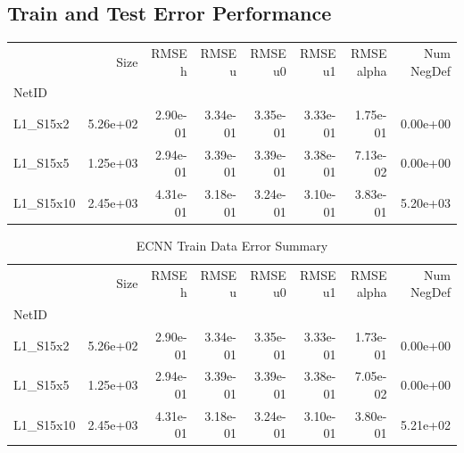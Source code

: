 \documentclass{article}
\theoremstyle{remark}
\numberwithin{equation}{subsection}
\begin{document}
\begin{figure}[H]
\end{figure}


\subsection{Train and Test Error Performance}

\begin{table}[H]

\begin{tabular}{lrrrrrrr}
	\toprule
	{} &     Size &   RMSE h &   RMSE u &  RMSE u0 &  RMSE u1 &  RMSE alpha &  Num NegDef \\
	NetID     &          &          &          &          &          &             &             \\
	\midrule
	L1\_S15x2  & 5.26e+02 & 2.90e-01 & 3.34e-01 & 3.35e-01 & 3.33e-01 &    1.75e-01 &    0.00e+00 \\
	L1\_S15x5  & 1.25e+03 & 2.94e-01 & 3.39e-01 & 3.39e-01 & 3.38e-01 &    7.13e-02 &    0.00e+00 \\
	L1\_S15x10 & 2.45e+03 & 4.31e-01 & 3.18e-01 & 3.24e-01 & 3.10e-01 &    3.83e-01 &    5.20e+03 \\
	\bottomrule
\end{tabular}
\end{table}

\begin{table}[H]
\begin{tabular}{lrrrrrrr}
	\toprule
	{} &     Size &   RMSE h &   RMSE u &  RMSE u0 &  RMSE u1 &  RMSE alpha &  Num NegDef \\
	NetID     &          &          &          &          &          &             &             \\
	\midrule
	L1\_S15x2  & 5.26e+02 & 2.90e-01 & 3.34e-01 & 3.35e-01 & 3.33e-01 &    1.73e-01 &    0.00e+00 \\
	L1\_S15x5  & 1.25e+03 & 2.94e-01 & 3.39e-01 & 3.39e-01 & 3.38e-01 &    7.05e-02 &    0.00e+00 \\
	L1\_S15x10 & 2.45e+03 & 4.31e-01 & 3.18e-01 & 3.24e-01 & 3.10e-01 &    3.80e-01 &    5.21e+02 \\
	\bottomrule
\end{tabular}

\caption{ECNN Train Data Error Summary}
\end{table}
\end{document}
